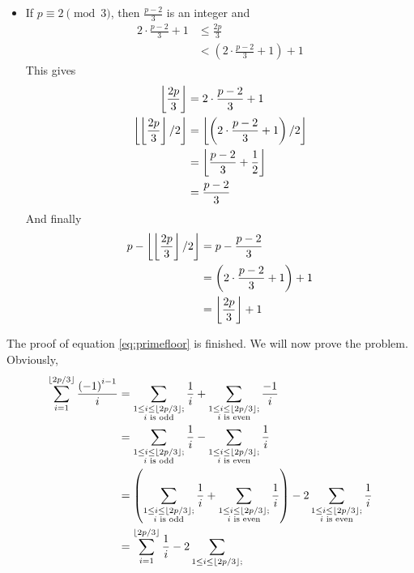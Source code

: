 \begin{solution}
\begin{itemize}
			\item If $p \equiv 2 \pmod 3$, then $\frac{p-2}{3}$ is an integer and
				\begin{align*}
					2\cdot\frac {p - 2}{3} + 1
						& \leq\frac {2p}{3}\\
						& < \left(2\cdot\frac {p - 2}{3} + 1\right) + 1
				\end{align*}
			This gives
				\begin{align*}
					\left\lfloor{\frac {2p}{3}}\right\rfloor
						&= 2\cdot\frac {p - 2}{3} + 1\\
					\left\lfloor{\left\lfloor{\frac {2p}{3}}\right\rfloor/2}\right\rfloor
						& =	\left\lfloor{\left(2\cdot\frac {p - 2}{3} + 1\right)/2}\right\rfloor\\
						& = \left\lfloor{\frac {p - 2}{3} + \frac {1}{2}}\right\rfloor\\
						& = \frac{p-2}{3}
				\end{align*}
			And finally
				\begin{align*}
					p - \left\lfloor{\left\lfloor{\frac {2p}{3}}\right\rfloor/2}\right\rfloor
						& = p - \frac {p - 2}{3}\\
						& = \left(2\cdot\frac {p - 2}{3} + 1\right) + 1\\
						& = \left\lfloor{\frac {2p}{3}}\right\rfloor+ 1
				\end{align*}
		\end{itemize}
		The proof of equation \eqref{eq:primefloor} is finished. We will now prove the problem. Obviously,
			\begin{align*}
				\sum_{i = 1}^{\left\lfloor{2p/3}\right\rfloor}\frac {\left( - 1\right)^{i - 1}}{i}
					&= \sum_{\substack{1\leq i\leq \left\lfloor{2p/3}\right\rfloor; \\
						i\text{ is odd}}}\frac {1}{i} + \sum_{\substack{1\leq i\leq \left\lfloor{2p/3}\right\rfloor; \\
						i\text{ is even}}}\frac { - 1}{i} \\
					&= \sum_{\substack{1\leq i\leq \left\lfloor{2p/3}\right\rfloor; \\
							i\text{ is odd}}}\frac {1}{i} - \sum_{\substack{1\leq i\leq \left\lfloor{2p/3}\right\rfloor; \\
							i\text{ is even}}}\frac {1}{i}\\
					&= \left(\sum_{\substack{1\leq i\leq \left\lfloor{2p/3}\right\rfloor; \\
							i\text{ is odd}}}\frac {1}{i} + \sum_{\substack{1\leq i\leq \left\lfloor{2p/3}\right\rfloor; \\
							i\text{ is even}}}\frac {1}{i}\right) - 2\sum_{\substack{1\leq i\leq \left\lfloor{2p/3}\right\rfloor; \\
							i\text{ is even}}}\frac {1}{i} \\
					&= \sum_{i = 1}^{\left\lfloor{2p/3}\right\rfloor}\frac {1}{i} - 2\sum_{\substack{1\leq i\leq \left\lfloor{2p/3}\right\rfloor; \\
}}
\end{align*}
\end{solution}
